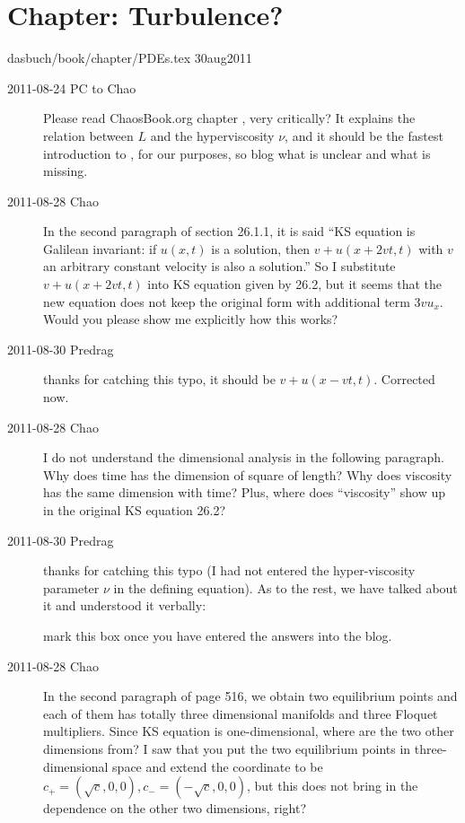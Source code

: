 \section{Chapter: Turbulence?}
\label{c-PDEs}\noindent dasbuch/book/chapter/PDEs.tex 30aug2011
\begin{description}


\item[2011-08-24 PC to Chao] Please read ChaosBook.org chapter
, very
critically? It explains the relation between $L$ and the hyperviscosity
$\nu$, and it should be the fastest introduction to \KSe, for our
purposes, so blog what is unclear and what is missing.

\item[2011-08-28 Chao]

In the second paragraph of section 26.1.1, it is said ``KS equation is
Galilean invariant: if $u(x,t)$ is a solution, then $v+u(x+2vt,t)$ with
$v$ an arbitrary constant velocity is also a solution.'' So I substitute
$v+u(x+2vt,t)$ into KS equation given by 26.2, but it seems that the new
equation does not keep the original form with additional term $3vu_x$.
Would you please show me explicitly how this works?

\item[2011-08-30 Predrag] thanks for catching this typo, it should be
$v+u(x-vt,t)$. Corrected now.

\item[2011-08-28 Chao]
I do not understand the dimensional analysis in the following
paragraph. Why does time has the dimension of square of length? Why does
viscosity has the same dimension with time? Plus, where does
``viscosity'' show up in the original KS equation 26.2?

\item[2011-08-30 Predrag] thanks for catching this typo (I had not
entered the hyper-viscosity parameter $\nu$ in the defining equation).
As to the rest, we have talked about it and understood it verbally:

 mark this box once you have entered the
answers into the blog.

\item[2011-08-28 Chao]
In the second paragraph of page 516, we obtain two equilibrium points and
each of them has totally three dimensional manifolds and three Floquet
multipliers. Since KS equation is one-dimensional, where are the two
other dimensions from? I saw that you put the two equilibrium points in
three-dimensional space and extend the coordinate to be $c_+ =
(\sqrt{c},0,0),c_- = (-\sqrt{c},0,0)$, but this does not bring in the
dependence on the other two dimensions, right?


\end{description}
